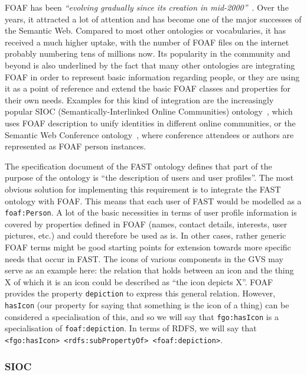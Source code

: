 \documentclass{article}
\begin{document}
FOAF has been \emph{``evolving gradually since its creation in mid-2000''}~\cite{brickley2004foaf}. Over the years, it attracted a lot of attention and has become one of the major successes of the Semantic Web. Compared to most other ontologies or vocabularies, it has received a much higher uptake, with the number of FOAF files on the internet probably numbering tens of millions now. Its popularity in the community and beyond is also underlined by the fact that many other ontologies are integrating FOAF in order to represent basic information regarding people, or they are using it as a point of reference and extend the basic FOAF classes and properties for their own needs. Examples for this kind of integration are the increasingly popular SIOC (Semantically-Interlinked Online Communities) ontology~\cite{breslin2005communitiesEswc}, which uses FOAF description to unify identities in different online communities, or the Semantic Web Conference ontology~\cite{moeller2007dogfood}, where conference attendees or authors are represented as FOAF person instances.

The specification document of the FAST ontology defines that part of the purpose of the ontology is ``the description of users and user profiles''. The most obvious solution for implementing this requirement is to integrate the FAST ontology with FOAF. This means that each user of FAST would be modelled as a \texttt{foaf:Person}. A lot of the basic necessities in terms of user profile information is covered by properties defined in FOAF (names, contact details, interests, user pictures, etc.) and could therefore be used as is. In other cases, rather generic FOAF terms might be good starting points for extension towards more specific needs that occur in FAST. The icons of various components in the GVS may serve as an example here: the relation that holds between an icon and the thing X of which it is an icon could be described as ``the icon depicts X''. FOAF provides the property \texttt{depiction} to express this general relation. However, \texttt{hasIcon} (our property for saying that something is the icon of a thing) can be considered a specialisation of this, and so we will say that \texttt{fgo:hasIcon} is a specialisation of \texttt{foaf:depiction}. In terms of RDFS, we will say that \texttt{<fgo:hasIcon> <rdfs:subPropertyOf> <foaf:depiction>}.

\subsubsection{SIOC} %
\label{ssub:sioc}
\end{document}
